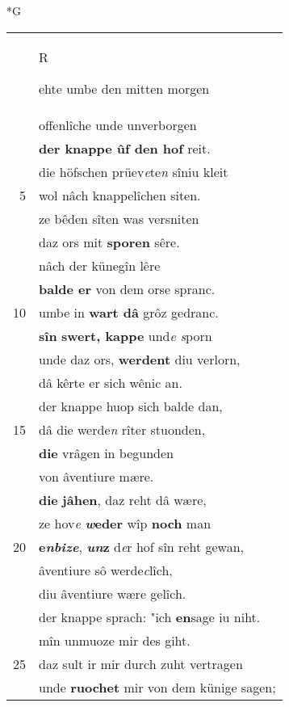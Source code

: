 \documentclass[8pt,a4paper,notitlepage]{article}
\begin{document}
\begin{table}[ht]
\begin{minipage}[t]{0.5\linewidth}
\small
\begin{center}*G
\end{center}
\begin{tabular}{rl}
 & \begin{large}R\end{large}ehte umbe den mitten morgen\\ 
 & offenlîche unde unverborgen\\ 
 & \textbf{der knappe ûf den hof} reit.\\ 
 & die höfschen prüev\textit{e}te\textit{n} sîniu kleit\\ 
5 & wol nâch knappelîchen siten.\\ 
 & ze bêden sîten was versniten\\ 
 & daz ors mit \textbf{sporen} sêre.\\ 
 & nâch der künegîn lêre\\ 
 & \textbf{balde er} von dem orse spranc.\\ 
10 & umbe in \textbf{wart dâ} grôz gedranc.\\ 
 & \textbf{sîn} \textbf{swert, kappe} und\textit{e s}porn\\ 
 & unde daz ors, \textbf{werdent} diu verlorn,\\ 
 & dâ kêrte er sich wênic an.\\ 
 & der knappe huop sich balde dan,\\ 
15 & dâ die werde\textit{n} rîter stuonden,\\ 
 & \textbf{die} vrâgen in begunden\\ 
 & von âventiure mære.\\ 
 & \textbf{die} \textbf{jâhen}, daz reht dâ wære,\\ 
 & ze hov\textit{e} \textbf{\textit{w}eder} wîp \textbf{noch} man\\ 
20 & \textbf{e\textit{nbize}}, \textbf{\textit{un}z} d\textit{e}r hof sîn reht gewan,\\ 
 & âventiure sô werde\textit{c}lîch,\\ 
 & diu âventiure wære gelîch.\\ 
 & der knappe sprach: "ich \textbf{en}sage iu niht.\\ 
 & mîn unmuoze mir des giht.\\ 
25 & daz sult ir mir durch zuht vertragen\\ 
 & unde \textbf{ruochet} mir von dem künige sagen;\\ 

\end{tabular}
\end{minipage}
\end{table}
\end{document}
